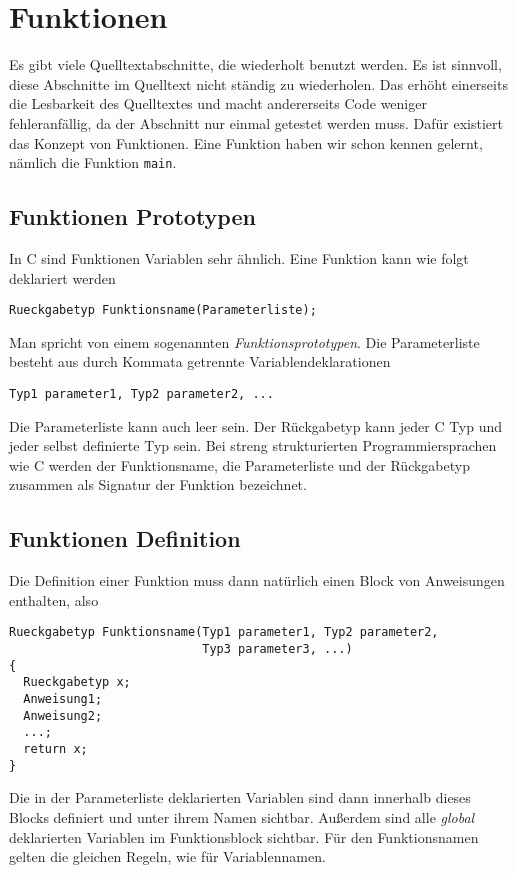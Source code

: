 \section{Funktionen}

Es gibt viele Quelltextabschnitte, die wiederholt benutzt werden.
Es ist sinnvoll, diese Abschnitte im Quelltext nicht ständig zu wiederholen.
Das erhöht einerseits die Lesbarkeit des Quelltextes und macht andererseits Code weniger fehleranfällig, da der Abschnitt nur einmal getestet werden muss.
Dafür existiert das Konzept von Funktionen.
Eine Funktion haben wir schon kennen gelernt, nämlich die Funktion \verb|main|. 

\subsection{Funktionen Prototypen}

In C sind Funktionen Variablen sehr ähnlich.
Eine Funktion kann wie folgt deklariert werden
\begin{lstlisting}
Rueckgabetyp Funktionsname(Parameterliste);
\end{lstlisting}
Man spricht von einem sogenannten \emph{Funktionsprototypen}.
Die Parameterliste besteht aus durch Kommata getrennte Variablendeklarationen
\begin{lstlisting}
Typ1 parameter1, Typ2 parameter2, ...
\end{lstlisting}
Die Parameterliste kann auch leer sein.
Der Rückgabetyp kann jeder C Typ und jeder selbst definierte Typ sein.
Bei streng strukturierten Programmiersprachen wie C werden der Funktionsname, die Parameterliste und der Rückgabetyp zusammen als Signatur der Funktion bezeichnet.

\subsection{Funktionen Definition}

Die Definition einer Funktion muss dann natürlich einen Block von Anweisungen enthalten, also
\begin{lstlisting}
Rueckgabetyp Funktionsname(Typ1 parameter1, Typ2 parameter2,
                           Typ3 parameter3, ...)
{
  Rueckgabetyp x;
  Anweisung1;
  Anweisung2;
  ...;
  return x;
}
\end{lstlisting}
Die in der Parameterliste deklarierten Variablen sind dann innerhalb dieses Blocks definiert und unter ihrem Namen sichtbar.
Außerdem sind alle \emph{global} deklarierten Variablen im Funktionsblock sichtbar.
Für den Funktionsnamen gelten die gleichen Regeln, wie für Variablennamen.

